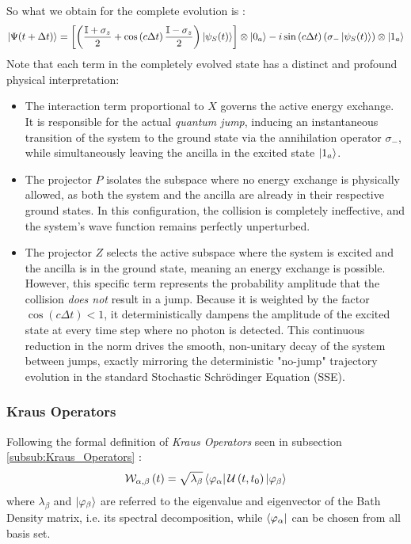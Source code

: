 \documentclass[a4paper,12pt]{article}
\begin{document}
So what we obtain for the complete evolution is :
\begin{equation}
	\ket{\Psi(t + \Delta t)} =  \left[\left( \frac{\mathbb{I} + \sigma_{z}}{2} + \cos \left(c \Delta t \right)   \frac{\mathbb{I} - \sigma_{z}}{2} \right)  \ket{\psi_{S} (t)}\right] \otimes \ket{0_{a}} -i \sin \left(c \Delta t\right) \left( \sigma_{-} \ket{\psi_{S} (t)} \right) \otimes \ket{1_{a}}
	\label{eq:complete_evolution_PE}
\end{equation}
Note that each term in the completely evolved state has a distinct and profound physical interpretation:
\begin{itemize}
	\item The interaction term proportional to $ X $ governs the active energy exchange. It is responsible for the actual \textit{quantum jump}, inducing an instantaneous transition of the system to the ground state via the annihilation operator $ \sigma_{-} $, while simultaneously leaving the ancilla in the excited state $ \ket{1_{a}} $.
	\item The projector $ P $ isolates the subspace where no energy exchange is physically allowed, as both the system and the ancilla are already in their respective ground states. In this configuration, the collision is completely ineffective, and the system's wave function remains perfectly unperturbed.
	\item The projector $ Z $ selects the active subspace where the system is excited and the ancilla is in the ground state, meaning an energy exchange is possible. However, this specific term represents the probability amplitude that the collision \textit{does not} result in a jump. Because it is weighted by the factor $ \cos(c \Delta t) < 1 $, it deterministically dampens the amplitude of the excited state at every time step where no photon is detected. This continuous reduction in the norm drives the smooth, non-unitary decay of the system between jumps, exactly mirroring the deterministic "no-jump" trajectory evolution in the standard Stochastic Schrödinger Equation (SSE).
\end{itemize}

\subsubsection{Kraus Operators}
\label{subsub:Kraus_Operators_PE}

Following the formal definition of \textit{Kraus Operators} seen in subsection \ref{subsub:Kraus_Operators} :
\begin{equation}
	\mathcal{W}_{\alpha, \beta} \left(t\right) = \sqrt{\lambda_{\beta}} \bra{\varphi_{\alpha}}  \mathcal{U}\left(t, t_0\right) \ket{\varphi_{\beta}}
	\label{eq:general_kraus_operators_PE}
\end{equation}
where $ \lambda_{\beta} $ and $ \ket{\varphi_{\beta}} $ are referred to the eigenvalue and eigenvector of the Bath Density matrix, i.e. its spectral decomposition, while $ \bra{\varphi_{\alpha}} $ can be chosen from all basis set. 
\end{document}
